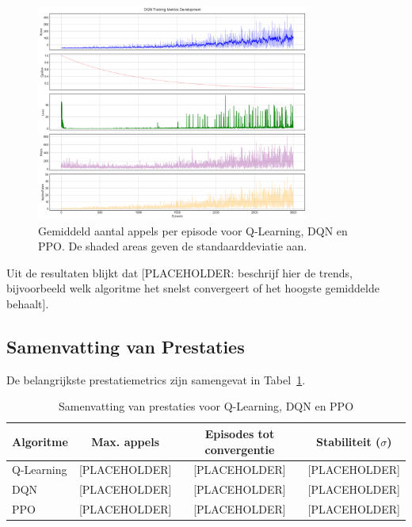 \documentclass[a4paper,11pt]{report}
\begin{document}
\begin{figure}[ht]
    \centering
    \includegraphics[width=0.8\textwidth]{../Experimenten/Experiment1Snake/DQN/dqn_analysis.png}
    \caption{Gemiddeld aantal appels per episode voor Q-Learning, DQN en PPO. De shaded areas geven de standaarddeviatie aan.}
    \label{fig:score_episode}
\end{figure}

Uit de resultaten blijkt dat [PLACEHOLDER: beschrijf hier de trends,
        bijvoorbeeld welk algoritme het snelst convergeert of het hoogste gemiddelde
        behaalt].

\subsection{Samenvatting van Prestaties}
De belangrijkste prestatiemetrics zijn samengevat in Tabel~\ref{tab:prestatie}.

\begin{table}[ht]
    \centering
    \caption{Samenvatting van prestaties voor Q-Learning, DQN en PPO}
    \label{tab:prestatie}
    \begin{tabular}{|l|c|c|c|}
        \hline
        \textbf{Algoritme} & \textbf{Max. appels} & \textbf{Episodes tot convergentie} & \textbf{Stabiliteit ($\sigma$)} \\ \hline
        Q-Learning         & [PLACEHOLDER]        & [PLACEHOLDER]                      & [PLACEHOLDER]                   \\ \hline
        DQN                & [PLACEHOLDER]        & [PLACEHOLDER]                      & [PLACEHOLDER]                   \\ \hline
        PPO                & [PLACEHOLDER]        & [PLACEHOLDER]                      & [PLACEHOLDER]                   \\ \hline
    \end{tabular}
\end{table}
\end{document}
